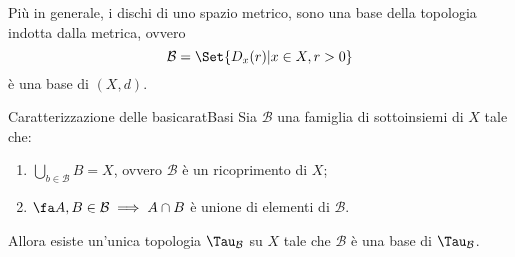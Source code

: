 \begin{ese}
    Più in generale, i dischi di uno spazio metrico, sono una base della topologia indotta dalla metrica, ovvero
    \[
        \mathcal{B}=\Set{D_x(r) | x\in X,r>0}
    \]
    è una base di \((X,d)\).
\end{ese}

\begin{prop}{Caratterizzazione delle basi}{caratBasi}
    Sia \(\mathcal{B}\) una famiglia di sottoinsiemi di \(X\) tale che:
    \begin{enumerate}
        \item \(\displaystyle\bigcup_{b\in\mathcal{B}}B=X\), ovvero \(\mathcal{B}\) è un ricoprimento di \(X\);
        \item \(\fa A,B\in \mathcal{B}\implies A\cap B\) è unione di elementi di \(\mathcal{B}\).
    \end{enumerate}
    Allora esiste un'unica topologia \(\Tau_{\mathcal{B}}\) su \(X\) tale che \(\mathcal{B}\) è una base di \(\Tau_{\mathcal{B}}\).
\end{prop}

